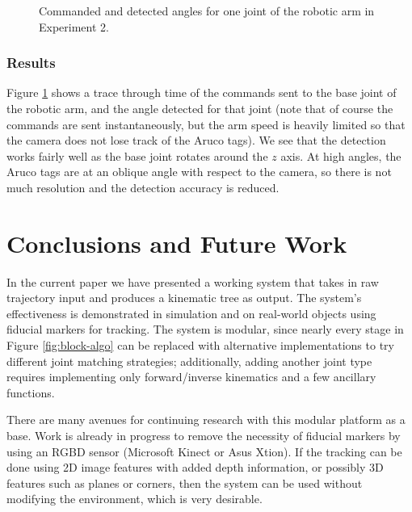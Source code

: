 \documentclass[a4paper,orivec]{llncs}
\begin{document}
\begin{figure}[ht]
\begin{minipage}{.45\textwidth}
    \vspace{-.1in}
    \caption{Commanded and detected angles for one joint of the robotic arm in Experiment 2.}
    \label{fig:exp2}
  \end{minipage}
  \hfill
  \vspace{-.2in}
\end{figure}

\subsubsection{Results}
Figure \ref{fig:exp2} shows a trace through time of the commands sent to the base joint of the robotic arm, and the angle detected for that joint (note that of course the commands are sent instantaneously, but the arm speed is heavily limited so that the camera does not lose track of the Aruco tags). We see that the detection works fairly well as the base joint rotates around the $z$ axis. At high angles, the Aruco tags are at an oblique angle with respect to the camera, so there is not much resolution and the detection accuracy is reduced.

\section{Conclusions and Future Work} \label{sec:conclusion}\label{sec:future}

In the current paper we have presented a working system that takes in raw trajectory input and produces a kinematic tree as output. The system's effectiveness is demonstrated in simulation and on real-world objects using fiducial markers for tracking. The system is modular, since nearly every stage in Figure \ref{fig:block-algo} can be replaced with alternative implementations to try different joint matching strategies; additionally, adding another joint type requires implementing only forward/inverse kinematics and a few ancillary functions.

There are many avenues for continuing research with this modular platform as a base. Work is already in progress to remove the necessity of fiducial markers by using an RGBD sensor (Microsoft Kinect or Asus Xtion). If the tracking can be done using 2D image features with added depth information, or possibly 3D features such as planes or corners, then the system can be used without modifying the environment, which is very desirable.
\end{document}

